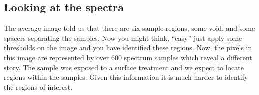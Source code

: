 \documentclass[letterpaper,10pt,english]{sphinxmanual}
\begin{document}
\begin{sphinxVerbatim}[commandchars=\\\{\}]
   
  
\end{sphinxVerbatim}

\noindent{}


\subsection{Looking at the spectra}
\label{\detokenize{ML4NeutronImageSegmentation:looking-at-the-spectra}}
The average image told us that there are six sample regions, some void, and some spacers separating the samples. Now you might think, “easy” just apply some thresholds on the image and you have identified these regions. Now, the pixels in this image are represented by over 600 spectrum samples which reveal a different story. The sample was exposed to a surface treatment and we expect to locate regions within the samples. Given this information it is much harder to identify the regions of interest.
\end{document}
